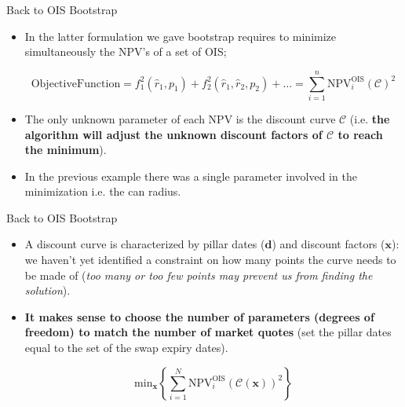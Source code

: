 \documentclass{beamer}
\begin{document}
\begin{frame}{Back to OIS Bootstrap}
\begin{itemize} 
 \item In the latter formulation we gave bootstrap requires to minimize simultaneously the NPV's of a set of OIS;
 
 \begin{equation}
 \mathrm{Objective Function} =	f_1^2(\hat{r}_1,p_1) + f_2^2(\hat{r}_1, \hat{r}_2,p_2) + \ldots =\sum_{i=1}^{n}\mathrm{NPV}^\mathrm{OIS}_i(\mathcal{C})^2
 \end{equation}
 
 \item  The only unknown parameter of each NPV is the discount curve $\mathcal{C}$ (i.e. \textbf{the algorithm will adjust the unknown discount factors of $\mathcal{C}$ to reach the minimum}).
 \item In the previous example there was a single parameter involved in the minimization i.e. the can radius.
\end{itemize}
\end{frame}

\begin{frame}{Back to OIS Bootstrap}
	\begin{itemize} 
 \item A discount curve is characterized by pillar dates ($\mathbf{d}$) and discount factors ($\mathbf{x}$):
we haven't yet identified a constraint on how many points the curve needs to be made of (\emph{too many or too few points may prevent us from finding the solution}).
  \item \textbf{It makes sense to choose the number of parameters (degrees of freedom) to match the number of market quotes} (set the pillar dates equal to the set of the swap expiry dates).
 
 \begin{equation}
  \mathrm{min}_{\mathbf{x}} \left\{\sum_{i=1}^{N}\mathrm{NPV}^\mathrm{OIS}_i( \mathcal{C}(\mathbf{x}))^2\right\}
 \end{equation}
\end{itemize}
\end{frame} 
     
\end{document}
